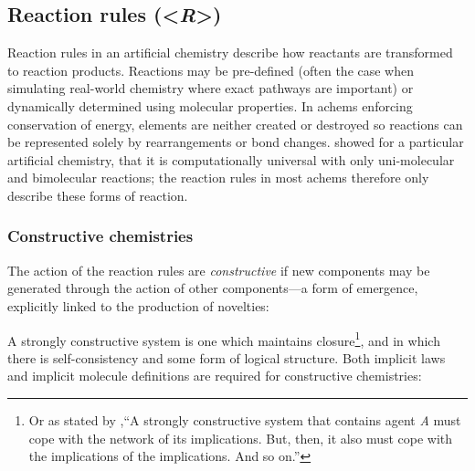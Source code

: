 \subsection{Reaction rules (\textless{}\emph{R}\textgreater{})}

Reaction rules in an artificial chemistry describe how reactants are transformed to reaction products. Reactions may be pre-defined (often the case when simulating real-world chemistry where exact pathways are important) or dynamically determined using molecular properties. In \glspl{achem} enforcing conservation of energy, elements are neither created or destroyed so reactions can be represented solely by rearrangements or bond changes. \Textcite{Tominaga2007} showed for a particular artificial chemistry, that it is computationally universal with only uni-molecular and bimolecular reactions; the reaction rules in most \glspl{achem} therefore only describe these forms of reaction.

\subsubsection{Constructive chemistries}\label{constructive-chemistries}


The action of the reaction rules are \textit{constructive} \parencite{Fontana1994} if new components may be generated through the action of other components---a form of emergence, explicitly linked to the production of novelties: 

A strongly constructive system is one which maintains closure\footnote{Or as stated by \textcite[217]{Fontana1994},``A strongly constructive system that contains agent \emph{A} must cope with the network of its implications. But, then, it also must cope with the implications of the implications. And so on.''}, and in which there is self-consistency and some form of logical structure. Both implicit laws and implicit molecule definitions are required for constructive chemistries:

